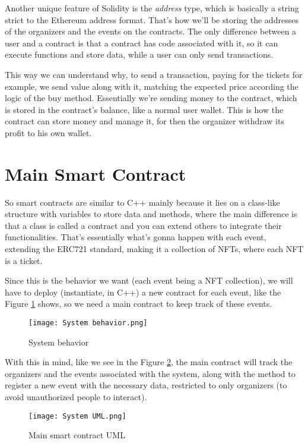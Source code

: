 Another unique feature of Solidity is the \textit{address} type, which is basically a string strict to the Ethereum address format. That's how we'll be storing the addresses of the organizers and the events on the contracts. The only difference between a user and a contract is that a contract has code associated with it, so it can execute functions and store data, while a user can only send transactions.

This way we can understand why, to send a transaction, paying for the tickets for example, we send value along with it, matching the expected price according the logic of the buy method. Essentially we're sending money to the contract, which is stored in the contract's balance, like a normal user wallet. This is how the contract can store money and manage it, for then the organizer withdraw its profit to his own wallet.

\section{Main Smart Contract}
\label{sec:main_smart_contract}

So smart contracts are similar to C++ mainly because it lies on a class-like structure with variables to store data and methods, where the main difference is that a class is called a contract and you can extend others to integrate their functionalities. That's essentially what's gonna happen with each event, extending the ERC721 standard, making it a collection of NFTs, where each NFT is a ticket.

Since this is the behavior we want (each event being a NFT collection), we will have to deploy (instantiate, in C++) a new contract for each event, like the Figure \ref{fig:system_behavior} shows, so we need a main contract to keep track of these events.

\begin{figure}[H]
    \texttt{[image: System behavior.png]}
    \centering
    \caption{System behavior}
    \label{fig:system_behavior}
\end{figure}

With this in mind, like we see in the Figure \ref{fig:system_uml}, the main contract will track the organizers and the events associated with the system, along with the method to register a new event with the necessary data, restricted to only organizers (to avoid unauthorized people to interact).

\begin{figure}[H]
    \texttt{[image: System UML.png]}
    \centering
    \caption{Main smart contract UML}
    \label{fig:system_uml}
\end{figure}

